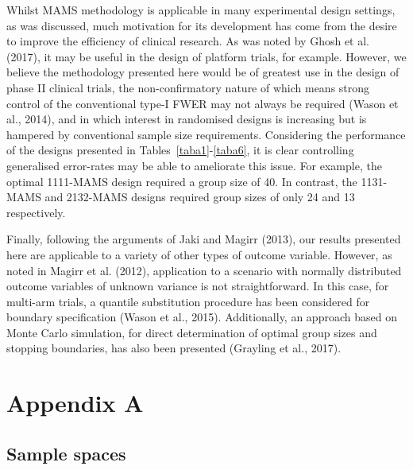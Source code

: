 \documentclass{article}
\numberwithin{equation}{section}
\theoremstyle{plain}
\begin{document}
Whilst MAMS methodology is applicable in many experimental design settings, as was discussed, much motivation for its development has come from the desire to improve the efficiency of clinical research. As was noted by Ghosh et al. (2017), it may be useful in the design of platform trials, for example. However, we believe the methodology presented here would be of greatest use in the design of phase II clinical trials, the non-confirmatory nature of which means strong control of the conventional type-I FWER may not always be required (Wason et al., 2014), and in which interest in randomised designs is increasing but is hampered by conventional sample size requirements. Considering the performance of the designs presented in Tables~\ref{taba1}-\ref{taba6}, it is clear controlling generalised error-rates may be able to ameliorate this issue. For example, the optimal 1111-MAMS design required a group size of 40. In contrast, the 1131-MAMS and 2132-MAMS designs required group sizes of only 24 and 13 respectively.

Finally, following the arguments of Jaki and Magirr (2013), our results presented here are applicable to a variety of other types of outcome variable. However, as noted in Magirr et al. (2012), application to a scenario with normally distributed outcome variables of unknown variance is not straightforward. In this case, for multi-arm trials, a quantile substitution procedure has been considered for boundary specification (Wason et al., 2015). Additionally, an approach based on Monte Carlo simulation, for direct determination of optimal group sizes and stopping boundaries, has also been presented (Grayling et al., 2017).

\section{Appendix A}\label{appA}

\subsection{Sample spaces}
\end{document}
